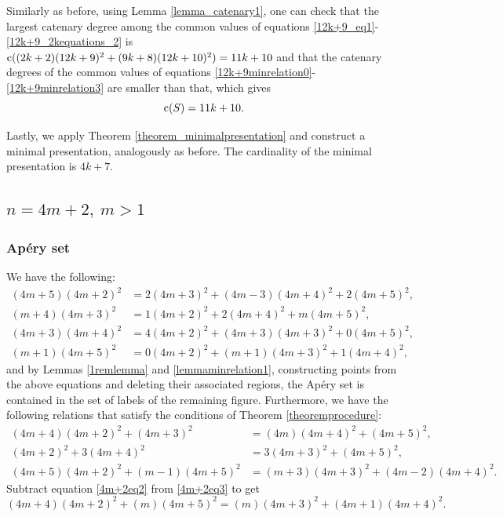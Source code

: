 \documentclass[12pt]{article}
\theoremstyle{remark}
\begin{document}
Similarly as before, using Lemma \ref{lemma_catenary1}, one can check that the largest catenary degree among the common values of equations \eqref{12k+9_eq1}-\eqref{12k+9_2kequations_2} is $\textup{c}((2k+2)(12k+9)^2 + (9k+8)(12k+10)^2 ) = 11k+10$ and that the catenary degrees of the common values of equations \eqref{12k+9minrelation0}-\eqref{12k+9minrelation3} are smaller than that, which gives
$$ \textup{c}(S) = 11k+10.$$

Lastly, we apply Theorem \ref{theorem_minimalpresentation} and construct a minimal presentation, analogously as before. The cardinality of the minimal presentation is $4k+7$.

\subsection{$n = 4m+2, \ m>1$}
\subsubsection{Ap{\'e}ry set}
We have the following:
\begin{align}
    (4m+5)(4m+2)^2 &= 2(4m+3)^2 + (4m-3)(4m+4)^2 + 2(4m+5)^2, \label{4m+2minrelation0} \\
    (m+4)(4m+3)^2 &= 1(4m+2)^2 + 2(4m+4)^2 + m(4m+5)^2, \label{4m+2minrelation1} \\
    (4m+3)(4m+4)^2 &= 4(4m+2)^2 + (4m+3)(4m+3)^2 + 0(4m+5)^2, \label{4m+2minrelation2}\\
    (m+1)(4m+5)^2 &= 0(4m+2)^2 + (m+1)(4m+3)^2 + 1(4m+4)^2,  \label{4m+2minrelation3}
\end{align}
and by Lemmas \ref{1remlemma} and \ref{lemmaminrelation1}, constructing points from the above equations and deleting their associated regions, the Ap{\'e}ry set is contained in the set of labels of the remaining figure.
Furthermore, we have the following relations that satisfy the conditions of Theorem \ref{theoremprocedure}:
\begin{align}
    (4m+4)(4m+2)^2 + (4m+3)^2 &= (4m)(4m+4)^2 + (4m+5)^2,\label{4m+2eq1}\\
    (4m+2)^2+3(4m+4)^2 &= 3(4m+3)^2 + (4m+5)^2,\label{4m+2eq2}\\
    (4m+5)(4m+2)^2 + (m-1)(4m+5)^2 &= (m+3)(4m+3)^2 + (4m-2)(4m+4)^2.\label{4m+2eq3}
\end{align}
Subtract equation \eqref{4m+2eq2} from \eqref{4m+2eq3} to get
\begin{equation}\label{4m+2eq4}
     (4m+4)(4m+2)^2 + (m)(4m+5)^2 = (m)(4m+3)^2 + (4m+1)(4m+4)^2.
\end{equation}
\end{document}
